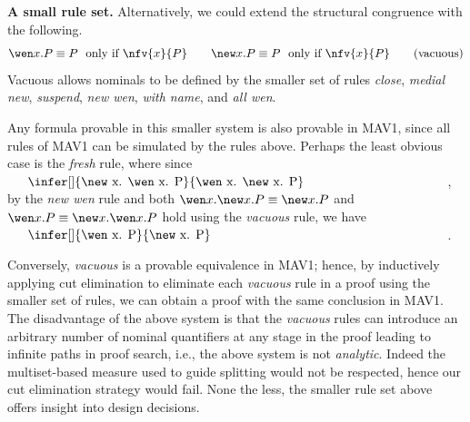 \documentclass[UKenglish,acmsmall,authorversion]{acmart}
\theoremstyle{plain}
\begin{document}
\textbf{A small rule set.}
Alternatively, we could extend the structural congruence with the following. %
\[
\wen x. P \equiv P 
~~\mbox{only if $\nfv{x}{P}$}
\qquad
\new x. P \equiv P 
~~\mbox{only if $\nfv{x}{P}$}
\qquad\mbox{(vacuous)}
\]
Vacuous allows nominals to be defined by the smaller set of rules \textit{close}, \textit{medial new}, \textit{suspend}, \textit{new wen}, \textit{with name}, and \textit{all wen}.

Any formula provable in this smaller system is also provable in \textsf{MAV1}, since all rules of \textsf{MAV1} can be simulated by the rules above.
Perhaps the least obvious case is the \textit{fresh} rule,
where since 
$
\vcenter{
\infer[]{\new x. \wen x. P}{\wen x. \new x. P}}
$, 
by the \textit{new wen} rule
and both 
$\wen x. \new x. P \equiv \new x. P$
and
$\wen x. P \equiv \new x. \wen x. P$
hold
using the \textit{vacuous} rule,
we have 
$
\vcenter{
\infer[]{\wen x. P}{\new x. P}}
$.

Conversely, \textit{vacuous} is a provable equivalence in \textsf{MAV1}; hence, by inductively applying cut elimination to eliminate each \textit{vacuous} rule in a proof using the smaller set of rules, we can obtain a proof with the same conclusion in \textsf{MAV1}.
The disadvantage of the above system is that the \textit{vacuous} rules can introduce an arbitrary number of nominal quantifiers at any stage in the proof leading to infinite paths in proof search,
i.e., the above system is not \textit{analytic}. 
Indeed the multiset-based measure used to guide splitting would not be respected, hence our cut elimination strategy would fail.
None the less, the smaller rule set above offers insight into design decisions.
\end{document}
